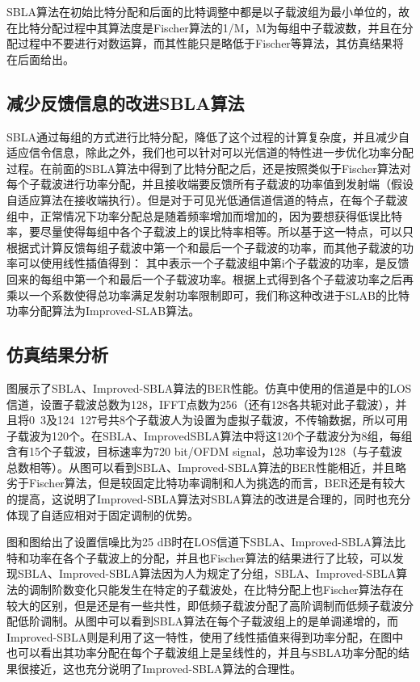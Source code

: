SBLA算法在初始比特分配和后面的比特调整中都是以子载波组为最小单位的，故在比特分配过程中其算法度是Fischer算法的1/M，M为每组中子载波数，并且在分配过程中不要进行对数运算，而其性能只是略低于Fischer等算法，其仿真结果将在后面给出。
\subsection{减少反馈信息的改进SBLA算法}
SBLA通过每组的方式进行比特分配，降低了这个过程的计算复杂度，并且减少自适应信令信息，除此之外，我们也可以针对可以光信道的特性进一步优化功率分配过程。在前面的SBLA算法中得到了比特分配之后，还是按照类似于Fischer算法对每个子载波进行功率分配，并且接收端要反馈所有子载波的功率值到发射端（假设自适应算法在接收端执行）。但是对于可见光低通信道信道的特点，在每个子载波组中，正常情况下功率分配总是随着频率增加而增加的，因为要想获得低误比特率，要尽量使得每组中各个子载波上的误比特率相等。所以基于这一特点，可以只根据式计算反馈每组子载波中第一个和最后一个子载波的功率，而其他子载波的功率可以使用线性插值得到：
其中表示一个子载波组中第i个子载波的功率，是反馈回来的每组中第一个和最后一个子载波功率。根据上式得到各个子载波功率之后再乘以一个系数使得总功率满足发射功率限制即可，我们称这种改进于SLAB的比特功率分配算法为Improved-SLAB算法。

\subsection{仿真结果分析}
图展示了SBLA、Improved-SBLA算法的BER性能。仿真中使用的信道是中的LOS信道，设置子载波总数为128，IFFT点数为256（还有128各共轭对此子载波），并且将0~3及124~127号共8个子载波人为设置为虚拟子载波，不传输数据，所以可用子载波为120个。在SBLA、ImprovedSBLA算法中将这120个子载波分为8组，每组含有15个子载波，目标速率为720 bit/OFDM signal，总功率设为128（与子载波总数相等）。从图可以看到SBLA、Improved-SBLA算法的BER性能相近，并且略劣于Fischer算法，但是较固定比特功率调制和人为挑选的而言，BER还是有较大的提高，这说明了Improved-SBLA算法对SBLA算法的改进是合理的，同时也充分体现了自适应相对于固定调制的优势。


图和图给出了设置信噪比为25 dB时在LOS信道下SBLA、Improved-SBLA算法比特和功率在各个子载波上的分配，并且也Fischer算法的结果进行了比较，可以发现SBLA、Improved-SBLA算法因为人为规定了分组，SBLA、Improved-SBLA算法的调制阶数变化只能发生在特定的子载波处，在比特分配上也Fischer算法存在较大的区别，但是还是有一些共性，即低频子载波分配了高阶调制而低频子载波分配低阶调制。从图中可以看到SBLA算法在每个子载波组上的是单调递增的，而Improved-SBLA则是利用了这一特性，使用了线性插值来得到功率分配，在图中也可以看出其功率分配在每个子载波组上是呈线性的，并且与SBLA功率分配的结果很接近，这也充分说明了Improved-SBLA算法的合理性。

